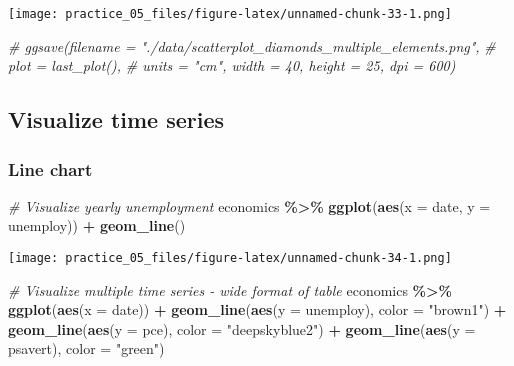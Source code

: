 \documentclass[
]{article}
\newenvironment{Shaded}{\begin{snugshade}}{\end{snugshade}}
\newcommand{\AttributeTok}[1]{\textcolor[rgb]{0.13,0.29,0.53}{#1}}
\newcommand{\CommentTok}[1]{\textcolor[rgb]{0.56,0.35,0.01}{\textit{#1}}}
\newcommand{\FunctionTok}[1]{\textcolor[rgb]{0.13,0.29,0.53}{\textbf{#1}}}
\newcommand{\NormalTok}[1]{#1}
\newcommand{\SpecialCharTok}[1]{\textcolor[rgb]{0.81,0.36,0.00}{\textbf{#1}}}
\newcommand{\StringTok}[1]{\textcolor[rgb]{0.31,0.60,0.02}{#1}}
\begin{document}
\texttt{[image: practice\_05\_files/figure-latex/unnamed-chunk-33-1.png]}

\begin{Shaded}
\begin{Highlighting}[]
\CommentTok{\# ggsave(filename = "./data/scatterplot\_diamonds\_multiple\_elements.png", }
\CommentTok{\#        plot = last\_plot(),}
\CommentTok{\#        units = "cm", width = 40, height = 25, dpi = 600) }
\end{Highlighting}
\end{Shaded}

\subsection{Visualize time series}\label{visualize-time-series}

\subsubsection{Line chart}\label{line-chart}

\begin{Shaded}
\begin{Highlighting}[]
\CommentTok{\# Visualize yearly unemployment}
\NormalTok{economics }\SpecialCharTok{\%\textgreater{}\%} 
  \FunctionTok{ggplot}\NormalTok{(}\FunctionTok{aes}\NormalTok{(}\AttributeTok{x =}\NormalTok{ date,}
             \AttributeTok{y =}\NormalTok{ unemploy)) }\SpecialCharTok{+}
  \FunctionTok{geom\_line}\NormalTok{()}
\end{Highlighting}
\end{Shaded}

\texttt{[image: practice\_05\_files/figure-latex/unnamed-chunk-34-1.png]}

\begin{Shaded}
\begin{Highlighting}[]
\CommentTok{\# Visualize multiple time series {-} wide format of table}
\NormalTok{economics }\SpecialCharTok{\%\textgreater{}\%} 
  \FunctionTok{ggplot}\NormalTok{(}\FunctionTok{aes}\NormalTok{(}\AttributeTok{x =}\NormalTok{ date)) }\SpecialCharTok{+}
  \FunctionTok{geom\_line}\NormalTok{(}\FunctionTok{aes}\NormalTok{(}\AttributeTok{y =}\NormalTok{ unemploy), }\AttributeTok{color =} \StringTok{"brown1"}\NormalTok{) }\SpecialCharTok{+}
  \FunctionTok{geom\_line}\NormalTok{(}\FunctionTok{aes}\NormalTok{(}\AttributeTok{y =}\NormalTok{ pce),      }\AttributeTok{color =} \StringTok{"deepskyblue2"}\NormalTok{) }\SpecialCharTok{+}
  \FunctionTok{geom\_line}\NormalTok{(}\FunctionTok{aes}\NormalTok{(}\AttributeTok{y =}\NormalTok{ psavert),  }\AttributeTok{color =} \StringTok{"green"}\NormalTok{)}
\end{Highlighting}
\end{Shaded}
\end{document}
